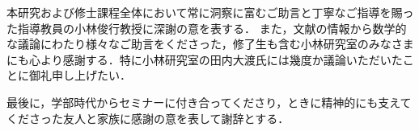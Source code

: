 本研究および修士課程全体において常に洞察に富むご助言と丁寧なご指導を賜った指導教員の小林俊行教授に深謝の意を表する．%
また，文献の情報から数学的な議論にわたり様々なご助言をくださった，修了生も含む小林研究室のみなさまにも心より感謝する．特に小林研究室の田内大渡氏には幾度か議論いただいたことに御礼申し上げたい．

最後に，学部時代からセミナーに付き合ってくださり，ときに精神的にも支えてくださった友人と家族に感謝の意を表して謝辞とする．

\begin{comment}
  多くのご指導とご協力を賜りました小林俊行先生に深謝の意を表します．粘り強く丁寧なご指導のおかげで本論文は完成いたしました.
  また，論文執筆の際にご助言や相談に乗っていただいた，研究室の各位そして同期の皆様にも感謝いたします.
  最後に，温かく見守り支援してくださった友人と家族に感謝の意を表して謝辞といたします．




  First of all, I would like to show my profound gratitude to professor Toshiyuki Kobayashi, for his constant support and encouragement, who introduced me to this beautiful field. His strict and patient guidance broadened my knowledge, making me grow up as a mathematician. This master dissertation has been possible thanks to him.
  I am also deeply thankful to all the members of Kobayashi’s lab; specially to K. Kannaka, T. Satomi, Y. Inoue, R. Fujita and T. Okuda, who are always supporting me and keeping me active with interesting questions and debates.
  The support of the office members of the faculty was also remarkable, specially the case of A. Nakamura; who constantly encouraged me these last two years.
  I would also like to express my appreciation to I. Vald ́es S ́anchez, J. M. Gonz ́alez Vega, S. Ishii and R. S ́anchez Molero for their continuous encouragement and understanding; they are always keeping me motivated.
  Last but not least, special thanks to the Japanese Ministry of Education, Culture, Sports, Science and Technology (MEXT), for their financial support throughout the last two years.
\end{comment}
